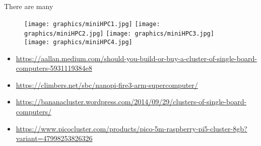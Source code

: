 \begin{frame}{There are many}
	\begin{figure}
		\centering
		\texttt{[image: graphics/miniHPC1.jpg]}
		\texttt{[image: graphics/miniHPC2.jpg]}
		\texttt{[image: graphics/miniHPC3.jpg]}
		\texttt{[image: graphics/miniHPC4.jpg]}
	\end{figure}
	
	{\tiny
		\begin{itemize}[label={$\color{UmUBlue}\bullet$}]
			\item  \url{https://aallan.medium.com/should-you-build-or-buy-a-cluster-of-single-board-computers-5931119384e8}
			\item \url{https://climbers.net/sbc/nanopi-fire3-arm-supercomputer/}
			\item \url{https://bananacluster.wordpress.com/2014/09/29/clusters-of-single-board-computers/}
			\item		\url{https://www.picocluster.com/products/pico-5m-raspberry-pi5-cluster-8gb?variant=47998253826326}

		\end{itemize}
	}
\end{frame}
